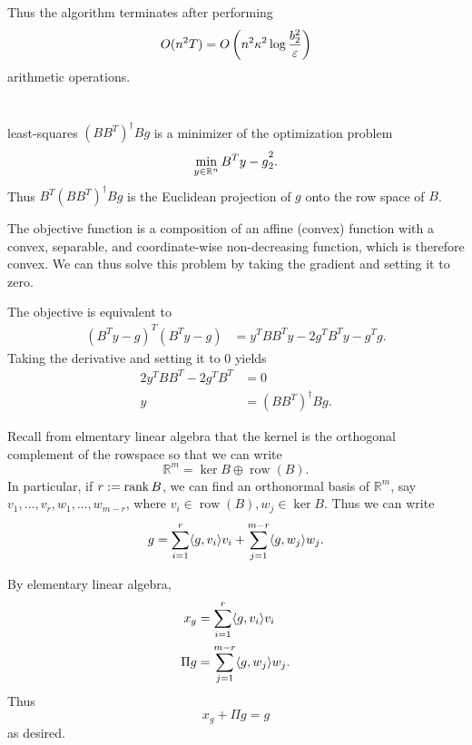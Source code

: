 \documentclass[10pt]{article}
\DeclarePairedDelimiter{\iprod}{\langle}{\rangle}
\let\norm\relax
\DeclarePairedDelimiter{\norm}{\lVert}{\rVert}
\DeclareMathOperator{\row}{row}
\newcommand{\R}{\mathbb{R}}
\begin{document}
Thus the algorithm terminates after performing
\[
  O(n^2 T)
  = O\left( n^2 \kappa^2 \log \frac{\norm{b}_2^2}{\varepsilon} \right)
\]
arithmetic operations.

\clearpage
\section{}
\begin{lem}{}{least-squares}
  $(BB^T)^\dagger Bg$ is a minimizer of the optimization problem
  \[
    \min_{y\in \R^n} \norm{B^Ty - g}_2^2.
  \]
  Thus $B^T(BB^T)^\dagger Bg$ is the Euclidean projection of $g$ onto the row space of $B$.
\end{lem}

\begin{pf}{}{}
  The objective function is a composition of an affine (convex) function
  with a convex, separable, and coordinate-wise non-decreasing function,
  which is therefore convex.
  We can thus solve this problem by taking the gradient and setting it to zero.

  The objective is equivalent to
  \begin{align*}
    (B^Ty - g)^T(B^Ty - g)
    &= y^TBB^Ty - 2g^TB^Ty - g^Tg.
  \end{align*}
  Taking the derivative and setting it to 0 yields
  \begin{align*}
    2y^TBB^T - 2g^TB^T &= 0 \\
    y &= (BB^T)^\dagger Bg.
  \end{align*}
\end{pf}

Recall from elmentary linear algebra that the kernel is the orthogonal complement of the rowspace
so that we can write
\[
  \R^m = \ker B \oplus \row(B).
\]
In particular,
if $r := \rank B$,
we can find an orthonormal basis of $\R^m$,
say $v_1, \dots, v_r, w_1, \dots, w_{m-r}$,
where $v_i\in \row(B), w_j\in \ker B$.
Thus we can write
\[
  g = \sum_{i=1}^r \iprod{g, v_i} v_i + \sum_{j=1}^{m-r} \iprod{g, w_j} w_j.
\]

By elementary linear algebra,
\begin{align*}
  x_g &= \sum_{i=1}^r \iprod{g, v_i} v_i \\
  \Pi g &= \sum_{j=1}^{m-r} \iprod{g, w_j} w_j.
\end{align*}
Thus
\[
  x_g + \Pi g = g
\]
as desired.
\end{document}
